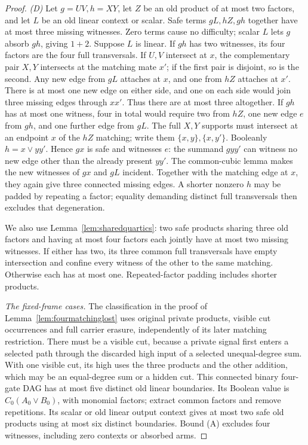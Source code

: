 \documentclass[11pt]{article}
\theoremstyle{definition}
\theoremstyle{remark}
\begin{document}
\begin{proof}
\emph{(D)} Let $g=UV,h=XY$, let $Z$ be an old product of at most two factors, and let $L$ be an old linear context or scalar. Safe terms $gL,hZ,gh$ together have at most three missing witnesses. Zero terms cause no difficulty; scalar $L$ lets $g$ absorb $gh$, giving $1+2$. Suppose $L$ is linear. If $gh$ has two witnesses, its four factors are the four full transversals. If $U,V$ intersect at $x$, the complementary pair $X,Y$ intersects at the matching mate $x'$; if the first pair is disjoint, so is the second. Any new edge from $gL$ attaches at $x$, and one from $hZ$ attaches at $x'$. There is at most one new edge on either side, and one on each side would join three missing edges through $xx'$. Thus there are at most three altogether. If $gh$ has at most one witness, four in total would require two from $hZ$, one new edge $e$ from $gh$, and one further edge from $gL$. The full $X,Y$ supports must intersect at an endpoint $x$ of the $hZ$ matching; write them $\{x,y\},\{x,y'\}$. Booleanly $h=x\vee yy'$. Hence $gx$ is safe and witnesses $e$: the summand $gyy'$ can witness no new edge other than the already present $yy'$. The common-cubic lemma makes the new witnesses of $gx$ and $gL$ incident. Together with the matching edge at $x$, they again give three connected missing edges. A shorter nonzero $h$ may be padded by repeating a factor; equality demanding distinct full transversals then excludes that degeneration.

We also use Lemma~\ref{lem:sharedquartics}: two safe products sharing three old factors and having at most four factors each jointly have at most two missing witnesses. If either has two, its three common full transversals have empty intersection and confine every witness of the other to the same matching. Otherwise each has at most one. Repeated-factor padding includes shorter products.

\emph{The fixed-frame cases.} The classification in the proof of Lemma~\ref{lem:fourmatchinglost} uses original private products, visible cut occurrences and full carrier erasure, independently of its later matching restriction. There must be a visible cut, because a private signal first enters a selected path through the discarded high input of a selected unequal-degree sum. With one visible cut, its high uses the three products and the other addition, which may be an equal-degree sum or a hidden cut. This connected binary four-gate DAG has at most five distinct old linear boundaries. Its Boolean value is $C_0(A_0\vee B_0)$, with monomial factors; extract common factors and remove repetitions. Its scalar or old linear output context gives at most two safe old products using at most six distinct boundaries. Bound (A) excludes four witnesses, including zero contexts or absorbed arms.


\end{proof}
\end{document}
